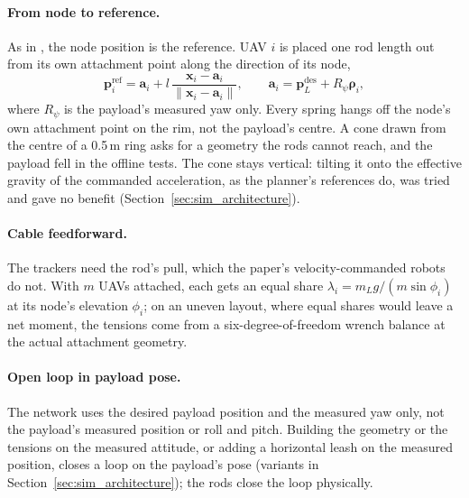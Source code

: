 \paragraph{From node to reference.} As in \cite{quan2025swarm}, the node position is the reference.
UAV $i$ is placed one rod length out from its own attachment point along the direction of its node,
\begin{equation}
    \mathbf{p}_i^{\mathrm{ref}} = \mathbf{a}_i + l\, \frac{\mathbf{x}_i - \mathbf{a}_i}{\|\mathbf{x}_i - \mathbf{a}_i\|},
    \qquad \mathbf{a}_i = \mathbf{p}_L^{\mathrm{des}} + R_\psi \boldsymbol{\rho}_i,
\end{equation}
where $R_\psi$ is the payload's measured yaw only. Every spring hangs off the node's own attachment
point on the rim, not the payload's centre. A cone drawn from the centre of a 0.5\,m ring asks for a
geometry the rods cannot reach, and the payload fell in the offline tests. The cone stays vertical:
tilting it onto the effective gravity of the commanded acceleration, as the planner's references do,
was tried and gave no benefit (Section~\ref{sec:sim_architecture}).

\paragraph{Cable feedforward.} The trackers need the rod's pull, which the paper's velocity-commanded
robots do not. With $m$ UAVs attached, each gets an equal share $\lambda_i = m_L g / (m \sin\phi_i)$ at
its node's elevation $\phi_i$; on an uneven layout, where equal shares would leave a net moment, the
tensions come from a six-degree-of-freedom wrench balance at the actual attachment geometry.

\paragraph{Open loop in payload pose.} The network uses the desired payload position and the measured yaw
only, not the payload's measured position or roll and pitch. Building the geometry or the tensions on the
measured attitude, or adding a horizontal leash on the measured position, closes a loop on the payload's
pose (variants in Section~\ref{sec:sim_architecture}); the rods close the loop physically.

